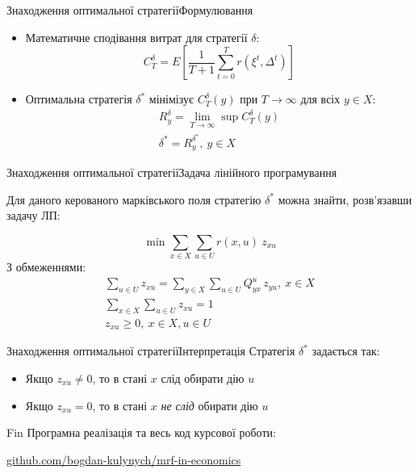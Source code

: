 \documentclass[pdf]{beamer}
\begin{document}
\begin{frame}{Знаходження оптимальної стратегії}{Формулювання}
	\begin{itemize}[<+->]
	\item Математичне сподівання витрат для стратегії \(\delta\):
	\[ C_T^{\delta} = E\left[\frac{1}{T+1}\sum_{t=0}^T r(\xi^t, \Delta^t)\right] \]
	\item Оптимальна стратегія \(\delta^*\) мінімізує \(C_T^{\delta}(y)\) при \(T\rightarrow\infty\) для всіх \(y \in X\):
	\begin{gather*}
	R_y^\delta = \lim\limits_{T \rightarrow \infty} \sup C_T^{\delta}(y) \\
	\delta^* = R_y^{\delta^*},\ y \in X
	\end{gather*}
	\end{itemize}
\end{frame}


\begin{frame}{Знаходження оптимальної стратегії}{Задача лінійного програмування}

Для даного керованого марківського поля стратегію \(\delta^*\) можна знайти, розв’язавши задачу ЛП:

\[\min \sum_{x \in X} \sum_{u \in U} r(x, u)\ z_{xu}\]
З обмеженнями:
\begin{gather*}
\sum_{u \in U} z_{xu} = \sum_{y \in X} \sum_{u \in U} Q_{yx}^u\,z_{yu},\ x \in X \\
\sum_{x \in X} \sum_{u \in U} z_{xu} = 1 \\
z_{xu} \geq 0,\ x \in X, u \in U
\end{gather*}

\end{frame}


\begin{frame}{Знаходження оптимальної стратегії}{Інтерпретація}
Стратегія \(\delta^*\) задається так:

\begin{itemize}
	\item Якщо \(z_{xu} \neq 0\), то в стані \(x\) слід обирати дію \(u\)
	\item Якщо \(z_{xu} = 0\), то в стані \(x\) \textit{не слід} обирати дію \(u\)
\end{itemize}
\end{frame}

\begin{frame}{Fin}
Програмна реалізація та весь код курсової роботи:

\begin{center}
	\url{github.com/bogdan-kulynych/mrf-in-economics}
\end{center}

\end{frame}
\end{document}
